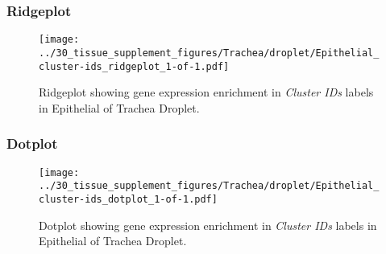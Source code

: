 \clearpage

\subsubsection{Ridgeplot}
\begin{figure}[h]
\centering
\texttt{[image: ../30\_tissue\_supplement\_figures/Trachea/droplet/Epithelial\_cluster-ids\_ridgeplot\_1-of-1.pdf]}

\caption{ Ridgeplot  showing gene expression enrichment in \emph{Cluster IDs} labels in Epithelial of Trachea Droplet. }
\end{figure}


\clearpage

\subsubsection{Dotplot}
\begin{figure}[h]
\centering
\texttt{[image: ../30\_tissue\_supplement\_figures/Trachea/droplet/Epithelial\_cluster-ids\_dotplot\_1-of-1.pdf]}

\caption{ Dotplot  showing gene expression enrichment in \emph{Cluster IDs} labels in Epithelial of Trachea Droplet. }
\end{figure}

